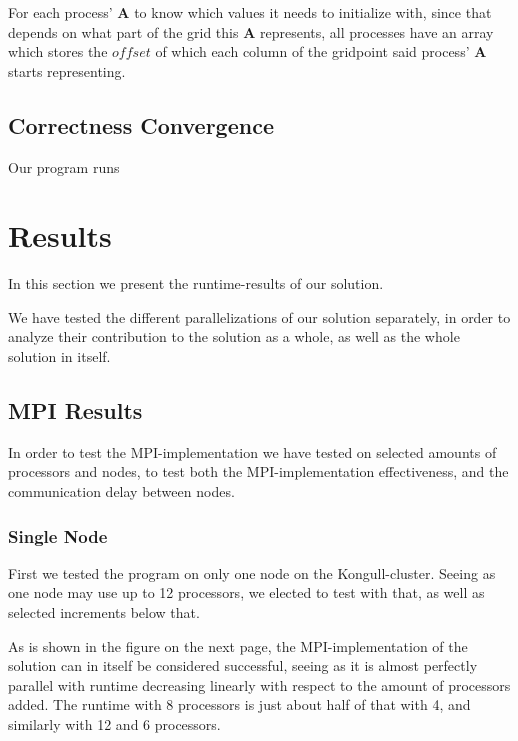 \documentclass[fontsize=11pt,paper=a4,titlepage]{article}
\begin{document}
For each process' $\mathbf{A}$ to know which values it needs to initialize with,
since that depends on what part of the grid this $\mathbf{A}$ represents, all
processes have an array which stores the $offset$ of which each column of the
gridpoint said process' $\mathbf{A}$ starts representing.

\subsection{Correctness Convergence}

Our program runs


\section{Results}

In this section we present the runtime-results of our solution.

We have tested the different parallelizations of our solution separately, in
order to analyze their contribution to the solution as a whole, as well as the
whole solution in itself.

\subsection{MPI Results}

In order to test the MPI-implementation we have tested on selected amounts of
processors and nodes, to test both the MPI-implementation effectiveness, and the
communication delay between nodes.

\subsubsection{Single Node}

First we tested the program on only one node on the Kongull-cluster. Seeing as
one node may use up to 12 processors, we elected to test with that, as well as
selected increments below that.

As is shown in the figure on the next page, the MPI-implementation of the
solution can in itself be considered successful, seeing as it is almost
perfectly parallel with runtime decreasing linearly with respect to the amount
of processors added. The runtime with 8 processors is just about half of that
with 4, and similarly with 12 and 6 processors.
\end{document}
